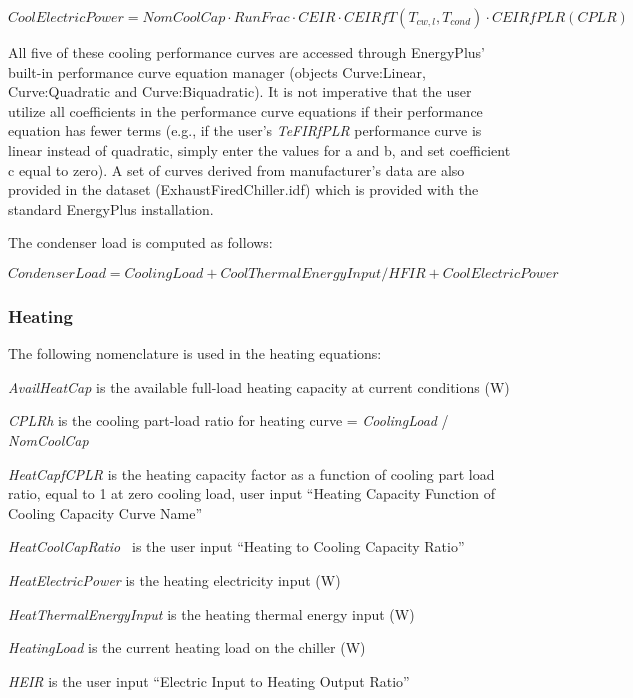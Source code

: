 \begin{equation}
CoolElectricPower = NomCoolCap \cdot RunFrac \cdot CEIR \cdot CEIRfT\left( {{T_{cw,l}},{T_{cond}}} \right) \cdot CEIRfPLR(CPLR)
\end{equation}

All five of these cooling performance curves are accessed through EnergyPlus' built-in performance curve equation manager (objects Curve:Linear, Curve:Quadratic and Curve:Biquadratic). It is not imperative that the user utilize all coefficients in the performance curve equations if their performance equation has fewer terms (e.g., if the user's \emph{TeFIRfPLR} performance curve is linear instead of quadratic, simply enter the values for a and b, and set coefficient c equal to zero). A set of curves derived from manufacturer's data are also provided in the dataset (ExhaustFiredChiller.idf) which is provided with the standard EnergyPlus installation.

The condenser load is computed as follows:

\begin{equation}
CondenserLoad = CoolingLoad + CoolThermalEnergyInput/HFIR + CoolElectricPower
\end{equation}

\subsubsection{Heating}\label{heating-1}

The following nomenclature is used in the heating equations:

\emph{AvailHeatCap} is the available full-load heating capacity at current conditions (W)

\emph{CPLRh} is the cooling part-load ratio for heating curve = \emph{CoolingLoad} / \emph{NomCoolCap}

\emph{HeatCapfCPLR} is the heating capacity factor as a function of cooling part load ratio, equal to 1 at zero cooling load, user input ``Heating Capacity Function of Cooling Capacity Curve Name''

\emph{HeatCoolCapRatio~} is the user input ``Heating to Cooling Capacity Ratio''

\emph{HeatElectricPower} is the heating electricity input (W)

\emph{HeatThermalEnergyInput} is the heating thermal energy input (W)

\emph{HeatingLoad} is the current heating load on the chiller (W)

\emph{HEIR} is the user input ``Electric Input to Heating Output Ratio''

